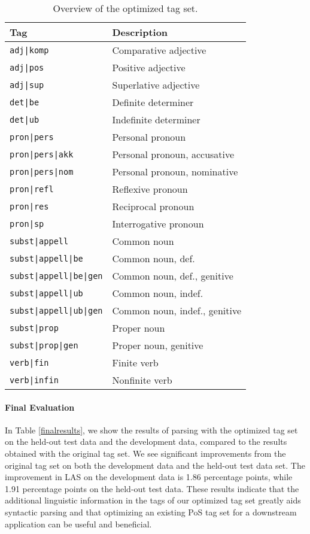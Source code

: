\documentclass[11pt,a4paper]{article}
\begin{document}
\begin{table}
    \centering
    \smaller[0.5]
    \begin{tabular}{@{}ll@{}}
        \toprule
        \textbf{Tag} & \textbf{Description} \\
        \midrule
        \texttt{adj|komp} & Comparative adjective \\
        \texttt{adj|pos} & Positive adjective \\
        \texttt{adj|sup} & Superlative adjective \\
        \texttt{det|be} & Definite determiner \\
        \texttt{det|ub} & Indefinite determiner \\
        \texttt{pron|pers} & Personal pronoun \\
        \texttt{pron|pers|akk} & Personal pronoun, accusative \\
        \texttt{pron|pers|nom} & Personal pronoun, nominative \\
        \texttt{pron|refl} & Reflexive pronoun \\
        \texttt{pron|res} & Reciprocal pronoun \\
        \texttt{pron|sp} & Interrogative pronoun \\
        \texttt{subst|appell} & Common noun \\
        \texttt{subst|appell|be} & Common noun, def. \\
        \texttt{subst|appell|be|gen} & Common noun, def., genitive \\
        \texttt{subst|appell|ub} & Common noun, indef. \\
        \texttt{subst|appell|ub|gen} & Common noun, indef., genitive \\
        \texttt{subst|prop} & Proper noun \\
        \texttt{subst|prop|gen} & Proper noun, genitive \\
        \texttt{verb|fin} & Finite verb \\
        \texttt{verb|infin} & Nonfinite verb \\
        \bottomrule
    \end{tabular}
    \caption{Overview of the optimized tag set.}
    \label{optimizedtagset}
\end{table}

\paragraph{Final Evaluation}
In Table \ref{finalresults}, we show the results of parsing with the optimized
tag set on the held-out test data and the development data, compared to the
results obtained with the original tag set. We see significant improvements
from the original tag set on both the development data and the held-out test
data set. The improvement in LAS on the development data is 1.86 percentage
points, while 1.91 percentage points on the held-out test data. These results
indicate that the additional linguistic information in the tags of our
optimized tag set greatly aids syntactic parsing and that optimizing an
existing PoS tag set for a downstream application can be useful and beneficial.
\end{document}
